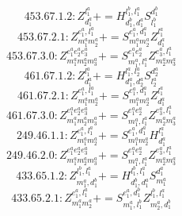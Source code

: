 \documentclass[letterpaper,10pt,fleqn,leqno,onecolumn]{article}
\begin{document}
\begin{equation} \;\;\;\;\;\;  453.67.1.2: Z^{l_{1}^{a}}_{d_{1}^{a}}+=H^{l_{1}^{b},l_{1}^{a}}_{d_{1}^{b},d_{1}^{a}}S^{d_{1}^{b}}_{l_{1}^{b}} \end{equation}
\begin{equation} \;\;\;\;\;\;  453.67.2.1: Z^{e_{1}^{a},l_{1}^{a}}_{m_{1}^{a}m_{2}^{a}}+=S^{e_{1}^{a},d_{1}^{a}}_{m_{1}^{a}m_{2}^{a}}Z^{l_{1}^{a}}_{d_{1}^{a}} \end{equation}
\begin{equation} \;\;\;\;\;\;  453.67.3.0: Z^{e_{1}^{a}e_{2}^{a}e_{3}^{a}}_{m_{1}^{a}m_{2}^{a}m_{3}^{a}}+=S^{e_{1}^{a}e_{2}^{a}}_{m_{1}^{a},l_{1}^{a}}Z^{e_{3}^{a},l_{1}^{a}}_{m_{2}^{a}m_{3}^{a}} \end{equation}
\begin{equation} \;\;\;\;\;\;  461.67.1.2: Z^{l_{1}^{a}}_{d_{1}^{a}}+=H^{l_{1}^{a},l_{2}^{a}}_{d_{1}^{a},d_{2}^{a}}S^{d_{2}^{a}}_{l_{2}^{a}} \end{equation}
\begin{equation} \;\;\;\;\;\;  461.67.2.1: Z^{e_{1}^{a},l_{1}^{a}}_{m_{1}^{a}m_{2}^{a}}+=S^{e_{1}^{a},d_{1}^{a}}_{m_{1}^{a}m_{2}^{a}}Z^{l_{1}^{a}}_{d_{1}^{a}} \end{equation}
\begin{equation} \;\;\;\;\;\;  461.67.3.0: Z^{e_{1}^{a}e_{2}^{a}e_{3}^{a}}_{m_{1}^{a}m_{2}^{a}m_{3}^{a}}+=S^{e_{1}^{a}e_{2}^{a}}_{m_{1}^{a},l_{1}^{a}}Z^{e_{3}^{a},l_{1}^{a}}_{m_{2}^{a}m_{3}^{a}} \end{equation}
\begin{equation} \;\;\;\;\;\;  249.46.1.1: Z^{e_{1}^{a},l_{1}^{a}}_{m_{1}^{a}m_{2}^{a}}+=S^{e_{1}^{a},d_{1}^{a}}_{m_{1}^{a}m_{2}^{a}}H^{l_{1}^{a}}_{d_{1}^{a}} \end{equation}
\begin{equation} \;\;\;\;\;\;  249.46.2.0: Z^{e_{1}^{a}e_{2}^{a}e_{3}^{a}}_{m_{1}^{a}m_{2}^{a}m_{3}^{a}}+=S^{e_{1}^{a}e_{2}^{a}}_{m_{1}^{a},l_{1}^{a}}Z^{e_{3}^{a},l_{1}^{a}}_{m_{2}^{a}m_{3}^{a}} \end{equation}
\begin{equation} \;\;\;\;\;\;  433.65.1.2: Z^{l_{1}^{b},l_{1}^{a}}_{m_{1}^{a},d_{1}^{b}}+=H^{l_{1}^{b},l_{1}^{a}}_{d_{1}^{b},d_{1}^{a}}S^{d_{1}^{a}}_{m_{1}^{a}} \end{equation}
\begin{equation} \;\;\;\;\;\;  433.65.2.1: Z^{e_{1}^{a},l_{1}^{a}}_{m_{1}^{a}m_{2}^{a}}+=S^{e_{1}^{a},d_{1}^{b}}_{m_{1}^{a},l_{1}^{b}}Z^{l_{1}^{b},l_{1}^{a}}_{m_{2}^{a},d_{1}^{b}} \end{equation}
\end{document}
